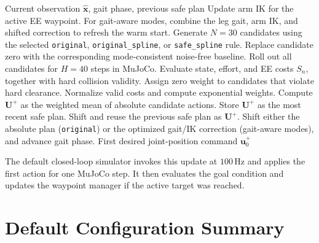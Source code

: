 \documentclass[11pt,a4paper]{article}
\newcommand{\code}[1]{\texttt{#1}}
\begin{document}
\begin{algorithm}[ht]
\caption{\code{legged\_mani} locomani MPPI update}
\label{alg:locomani_mppi}
\begin{algorithmic}[1]
  \REQUIRE Current observation $\hat{\bm{x}}$, gait phase, previous safe plan
  \STATE Update arm IK for the active EE waypoint.
  \STATE For gait-aware modes, combine the leg gait, arm IK, and shifted
         correction to refresh the warm start.
  \STATE Generate $N=30$ candidates using the selected
         \code{original}, \code{original\_spline}, or
         \code{safe\_spline} rule.
  \STATE Replace candidate zero with the corresponding mode-consistent
         noise-free baseline.
  \STATE Roll out all candidates for $H=40$ steps in MuJoCo.
  \STATE Evaluate state, effort, and EE costs $S_n$, together with hard
         collision validity.
  \STATE Assign zero weight to candidates that violate hard clearance.
    \STATE Normalize valid costs and compute exponential weights.
    \STATE Compute $\bm{U}^{+}$ as the weighted mean of absolute candidate
           actions.
    \STATE Store $\bm{U}^{+}$ as the most recent safe plan.
  \ELSE
    \STATE Shift and reuse the previous safe plan as $\bm{U}^{+}$.
  \ENDIF
  \STATE Shift either the absolute plan (\code{original}) or the optimized
         gait/IK correction (gait-aware modes), and advance gait phase.
  \RETURN First desired joint-position command $\bm{u}^{+}_0$
\end{algorithmic}
\end{algorithm}

The default closed-loop simulator invokes this update at $100\,\mathrm{Hz}$
and applies the first action for one MuJoCo step. It then evaluates the goal
condition and updates the waypoint manager if the active target was reached.

\section{Default Configuration Summary}
\end{document}
